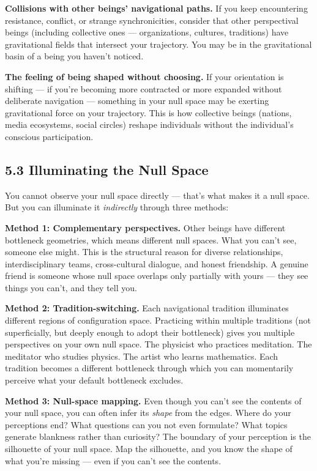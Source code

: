 \textbf{Collisions with other beings' navigational paths.} If you keep encountering resistance, conflict, or strange synchronicities, consider that other perspectival beings (including collective ones — organizations, cultures, traditions) have gravitational fields that intersect your trajectory. You may be in the gravitational basin of a being you haven't noticed.


\textbf{The feeling of being shaped without choosing.} If your orientation is shifting — if you're becoming more contracted or more expanded without deliberate navigation — something in your null space may be exerting gravitational force on your trajectory. This is how collective beings (nations, media ecosystems, social circles) reshape individuals without the individual's conscious participation.


\subsection*{5.3 Illuminating the Null Space}


You cannot observe your null space directly — that's what makes it a null space. But you can illuminate it \textit{indirectly} through three methods:


\textbf{Method 1: Complementary perspectives.} Other beings have different bottleneck geometries, which means different null spaces. What you can't see, someone else might. This is the structural reason for diverse relationships, interdisciplinary teams, cross-cultural dialogue, and honest friendship. A genuine friend is someone whose null space overlaps only partially with yours — they see things you can't, and they tell you.


\textbf{Method 2: Tradition-switching.} Each navigational tradition illuminates different regions of configuration space. Practicing within multiple traditions (not superficially, but deeply enough to adopt their bottleneck) gives you multiple perspectives on your own null space. The physicist who practices meditation. The meditator who studies physics. The artist who learns mathematics. Each tradition becomes a different bottleneck through which you can momentarily perceive what your default bottleneck excludes.


\textbf{Method 3: Null-space mapping.} Even though you can't see the contents of your null space, you can often infer its \textit{shape} from the edges. Where do your perceptions end? What questions can you not even formulate? What topics generate blankness rather than curiosity? The boundary of your perception is the silhouette of your null space. Map the silhouette, and you know the shape of what you're missing — even if you can't see the contents.


